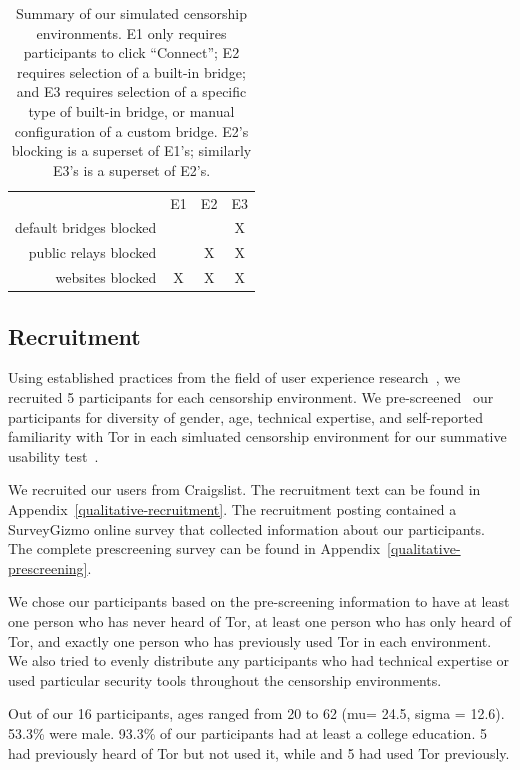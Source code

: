 \documentclass[USenglish,oneside,twocolumn]{article}
\begin{document}
\begin{table}
\centering
\begin{tabular}{r c c c}
& E1 & E2 & E3 \\
default bridges blocked & & & X \\
public relays blocked & & X & X \\
websites blocked & X & X & X \\
\end{tabular}
\caption{
Summary of our simulated censorship environments.
E1 only requires participants to click ``Connect'';
E2 requires selection of a built-in bridge;
and E3 requires selection of a specific type of built-in bridge,
or manual configuration of a custom bridge.
E2's blocking is a superset of E1's;
similarly E3's is a superset of E2's.
}
\label{tab:environments}
\end{table}

\subsection{Recruitment}
Using established practices from the field of user experience research~\cite{howmanyusers},
we recruited 5 participants for each censorship environment.
We pre-screened~\cite{screening} our participants for diversity of gender, age, technical expertise,
and self-reported familiarity with Tor in each simluated censorship environment for our summative
usability test~\cite{summative}. 

We recruited our users from Craigslist. The recruitment text can be found in 
Appendix~\ref{qualitative-recruitment}. The recruitment posting contained a 
SurveyGizmo online survey that collected information about our participants.
The complete prescreening survey can be found in Appendix~\ref{qualitative-prescreening}.  

We chose our participants based on the pre-screening information to have 
at least one person who has never heard of Tor, at least one person who has 
only heard of Tor, and exactly one person who has previously used Tor in each
environment. We also tried to evenly distribute any participants who had technical
expertise or used particular security tools throughout the censorship environments. 

Out of our 16 participants, ages ranged from 20 to 62
(mu= 24.5, sigma = 12.6). 53.3\% were male. 
93.3\% of our participants had at least
a college education. 5 had previously heard of Tor but not used it, while 
and 5 had used Tor previously. 
\end{document}
